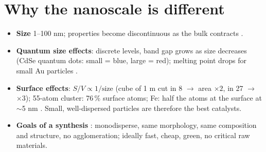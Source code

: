 \section{Why the nanoscale is different}
\label{sec:fundamentals}
\begin{itemize}
  \item \textbf{Size} 1--100 nm; properties become discontinuous as the bulk contracts .
  \item \textbf{Quantum size effects}: discrete levels, band gap grows as size decreases (CdSe quantum dots: small = blue,
        large = red); melting point drops for small Au particles .
  \item \textbf{Surface effects}: $S/V\propto 1/\text{size}$ (cube of 1 m cut in 8 $\to$ area $\times2$, in 27 $\to$ $\times3$);
        55-atom cluster: 76\,\% surface atoms; Fe: half the atoms at the surface at $\sim$5 nm .
        Small, well-dispersed particles are therefore the best catalysts.
  \item \textbf{Goals of a synthesis} : monodisperse, same morphology, same composition and structure, no agglomeration;
        ideally fast, cheap, green, no critical raw materials.
\end{itemize}
